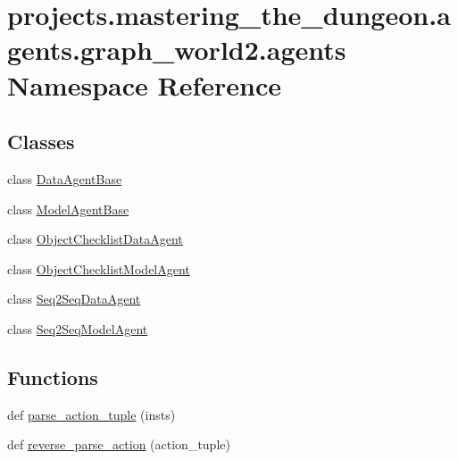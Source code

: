 \hypertarget{namespaceprojects_1_1mastering__the__dungeon_1_1agents_1_1graph__world2_1_1agents}{}\section{projects.\+mastering\+\_\+the\+\_\+dungeon.\+agents.\+graph\+\_\+world2.\+agents Namespace Reference}
\label{namespaceprojects_1_1mastering__the__dungeon_1_1agents_1_1graph__world2_1_1agents}
\subsection*{Classes}
\begin{DoxyCompactItemize}
\item 
class \hyperlink{classprojects_1_1mastering__the__dungeon_1_1agents_1_1graph__world2_1_1agents_1_1DataAgentBase}{Data\+Agent\+Base}
\item 
class \hyperlink{classprojects_1_1mastering__the__dungeon_1_1agents_1_1graph__world2_1_1agents_1_1ModelAgentBase}{Model\+Agent\+Base}
\item 
class \hyperlink{classprojects_1_1mastering__the__dungeon_1_1agents_1_1graph__world2_1_1agents_1_1ObjectChecklistDataAgent}{Object\+Checklist\+Data\+Agent}
\item 
class \hyperlink{classprojects_1_1mastering__the__dungeon_1_1agents_1_1graph__world2_1_1agents_1_1ObjectChecklistModelAgent}{Object\+Checklist\+Model\+Agent}
\item 
class \hyperlink{classprojects_1_1mastering__the__dungeon_1_1agents_1_1graph__world2_1_1agents_1_1Seq2SeqDataAgent}{Seq2\+Seq\+Data\+Agent}
\item 
class \hyperlink{classprojects_1_1mastering__the__dungeon_1_1agents_1_1graph__world2_1_1agents_1_1Seq2SeqModelAgent}{Seq2\+Seq\+Model\+Agent}
\end{DoxyCompactItemize}
\subsection*{Functions}
\begin{DoxyCompactItemize}
\item 
def \hyperlink{namespaceprojects_1_1mastering__the__dungeon_1_1agents_1_1graph__world2_1_1agents_a11c98f469df4fb4ecb640c91544dfe26}{parse\+\_\+action\+\_\+tuple} (insts)
\item 
def \hyperlink{namespaceprojects_1_1mastering__the__dungeon_1_1agents_1_1graph__world2_1_1agents_acfdb3e0a43d2dee8909bf189d4988739}{reverse\+\_\+parse\+\_\+action} (action\+\_\+tuple)
\end{DoxyCompactItemize}
